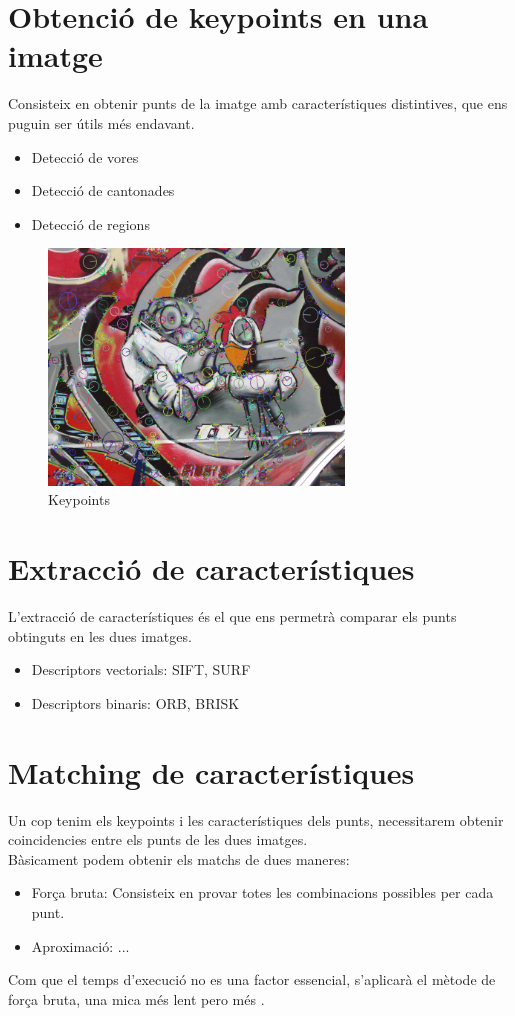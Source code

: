 \section{Obtenció de keypoints en una imatge}
	Consisteix en obtenir punts de la imatge amb característiques distintives, que ens puguin ser útils més endavant.
	\begin{itemize}	
		\item{Detecció de vores}
		\item{Detecció de cantonades}
		\item{Detecció de regions}
	\end{itemize}
	\begin{figure}[H]
		\centering
		\includegraphics[width=0.7\textwidth]{images/RobotKp}
		\caption{Keypoints}
	\end{figure}

\section{Extracció de característiques}

	L'extracció de característiques és el que ens permetrà comparar els punts obtinguts en les dues imatges.
	\begin{itemize}
		\item{Descriptors vectorials: SIFT, SURF}
		\item{Descriptors binaris: ORB, BRISK}
	\end{itemize}

\newpage
\section{Matching de característiques}

	Un cop tenim els keypoints i les característiques dels punts, necessitarem obtenir coincidencies entre els punts de les dues imatges.\\
	Bàsicament podem obtenir els matchs de dues maneres:\\
	\begin{itemize}	
		\item{Força bruta: Consisteix en provar totes les combinacions possibles per cada punt.}
		\item{Aproximació: ...}
	\end{itemize}
	Com que el temps d'execució no es una factor essencial, s'aplicarà el mètode de força bruta, una mica més lent pero més .

